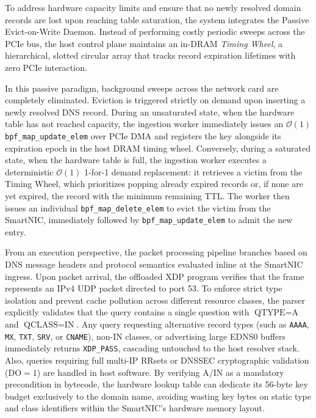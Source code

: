 \documentclass[a4paper,fleqn,colorlinks,hidelinks]{cas-sc}
\begin{document}
To address hardware capacity limits and ensure that no newly resolved domain records are lost upon reaching table saturation, the system integrates the Passive Evict-on-Write Daemon. Instead of performing costly periodic sweeps across the PCIe bus, the host control plane maintains an in-DRAM \textit{Timing Wheel}, a hierarchical, slotted circular array that tracks record expiration lifetimes with zero PCIe interaction.

In this passive paradigm, background sweeps across the network card are completely eliminated. Eviction is triggered strictly on demand upon inserting a newly resolved DNS record. During an unsaturated state, when the hardware table has not reached capacity, the ingestion worker immediately issues an $\mathcal{O}(1)$ \texttt{bpf\_map\_update\_elem} over PCIe DMA and registers the key alongside its expiration epoch in the host DRAM timing wheel. Conversely, during a saturated state, when the hardware table is full, the ingestion worker executes a deterministic $\mathcal{O}(1)$ 1-for-1 demand replacement: it retrieves a victim from the Timing Wheel, which prioritizes popping already expired records or, if none are yet expired, the record with the minimum remaining TTL. The worker then issues an individual \texttt{bpf\_map\_delete\_elem} to evict the victim from the SmartNIC, immediately followed by \texttt{bpf\_map\_update\_elem} to admit the new entry.

From an execution perspective, the packet processing pipeline branches based on DNS message headers and protocol semantics evaluated inline at the SmartNIC ingress. Upon packet arrival, the offloaded XDP program verifies that the frame represents an IPv4 UDP packet directed to port 53. To enforce strict type isolation and prevent cache pollution across different resource classes, the parser explicitly validates that the query contains a single question with $\text{QTYPE}=\text{A}$ and $\text{QCLASS}=\text{IN}$. Any query requesting alternative record types (such as \texttt{AAAA}, \texttt{MX}, \texttt{TXT}, \texttt{SRV}, or \texttt{CNAME}), non-IN classes, or advertising large EDNS0 buffers immediately returns \texttt{XDP\_PASS}, cascading untouched to the host resolver stack. Also, queries requiring full multi-IP RRsets or DNSSEC cryptographic validation ($\text{DO}=1$) are handled in host software. By verifying $\text{A}/\text{IN}$ as a mandatory precondition in bytecode, the hardware lookup table can dedicate its 56-byte key budget exclusively to the domain name, avoiding wasting key bytes on static type and class identifiers within the SmartNIC's hardware memory layout.
\end{document}
